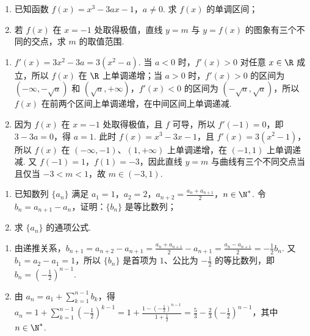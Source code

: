 \begin{problem}
\begin{enumerate}
\item 已知函数 \(f(x) = x^3 - 3ax - 1\)，\(a \neq 0\). 求 \( f(x) \) 的单调区间；
\item 若 \( f(x) \) 在 \(x = -1\) 处取得极值，直线 \(y = m\) 与 \(y = f(x)\) 的图象有三个不同的交点，求 \(m\) 的取值范围.
\end{enumerate}
\end{problem}

\begin{solution}
\begin{enumerate}
\item \(f'(x)=3x^{2}-3a=3(x^{2}-a)\). 当 \(a<0\) 时，\(f'(x)>0\) 对任意 \(x\in\R\) 成立，所以 \(f(x)\) 在 \(\R\) 上单调递增；当 \(a>0\) 时，\(f'(x)>0\) 的区间为 \(\left(-\infty,-\sqrt{a}\right)\) 和 \(\left(\sqrt{a},+\infty\right)\)，\(f'(x)<0\) 的区间为 \(\left(-\sqrt{a},\sqrt{a}\right)\)，所以 \(f(x)\) 在前两个区间上单调递增，在中间区间上单调递减.
\item 因为 \(f(x)\) 在 \(x=-1\) 处取得极值，且 \(f\) 可导，所以 \(f'(-1)=0\)，即 \(3-3a=0\)，得 \(a=1\). 此时 \(f(x)=x^{3}-3x-1\)，且 \(f'(x)=3(x^{2}-1)\)，所以 \(f(x)\) 在 \(\left(-\infty,-1\right)\)、\((1,+\infty)\) 上单调递增，在 \((-1,1)\) 上单调递减. 又 \(f(-1)=1\)，\(f(1)=-3\)，因此直线 \(y=m\) 与曲线有三个不同交点当且仅当 \(-3<m<1\)，故 \(m\in(-3,1)\).
\end{enumerate}
\end{solution}

\begin{problem}
\begin{enumerate}
\item 已知数列 \(\{a_{n}\}\) 满足 \(a_1 = 1\)，\(a_2 = 2\)，\(a_{n+2} = \frac{a_n + a_{n+1}}{2}\)，\(n \in \N^*\). 令 \( b_{n} = a_{n+1} - a_{n} \)，证明：\( \{b_{n}\} \) 是等比数列；
\item 求 \(\{a_{n}\}\) 的通项公式.
\end{enumerate}
\end{problem}

\begin{solution}
\begin{enumerate}
\item 由递推关系，\(b_{n+1}=a_{n+2}-a_{n+1}=\frac{a_{n}+a_{n+1}}{2}-a_{n+1}=\frac{a_{n}-a_{n+1}}{2}=-\frac{1}{2}b_{n}\). 又 \(b_{1}=a_{2}-a_{1}=1\)，所以 \(\{b_{n}\}\) 是首项为 \(1\)、公比为 \(-\frac{1}{2}\) 的等比数列，即 \(b_{n}=\left(-\frac{1}{2}\right)^{n-1}\).
\item 由 \(a_{n}=a_{1}+\sum_{k=1}^{n-1}b_{k}\)，得 \(a_{n}=1+\sum_{k=1}^{n-1}\left(-\frac{1}{2}\right)^{k-1}=1+\frac{1-\left(-\frac{1}{2}\right)^{n-1}}{1+\frac{1}{2}}=\frac{5}{3}-\frac{2}{3}\left(-\frac{1}{2}\right)^{n-1}\)，其中 \(n\in\N^*\).
\end{enumerate}
\end{solution}

